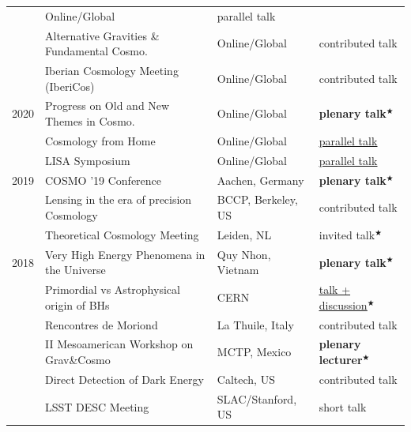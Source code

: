 \documentclass[11pt,a4paper]{article}
\begin{document}
\begin{longtable}{l p{} p{3.5cm} p{3cm}}
& Online/Global 
& parallel talk \\
& Alternative Gravities \& Fundamental Cosmo. %
& Online/Global & contributed talk \\
  & Iberian Cosmology Meeting (IberiCos)
& Online/Global 
& contributed talk \\
2020  & Progress on Old and New Themes in Cosmo. %
& Online/Global %
& \textbf{plenary talk$^\bigstar$} \\
& Cosmology from Home & Online/Global  & \href{https://youtu.be/MHcLT31gaYQ}{\underline{parallel talk}} \\
& LISA Symposium & Online/Global  & \href{https://youtu.be/D3vSuuwIyfs}{\underline{parallel talk}} \\
2019  
& {COSMO '19 Conference} & Aachen, Germany &  \textbf{plenary talk$^\bigstar$}  \\
& {Lensing in the era of precision Cosmology} & BCCP, Berkeley, US &  contributed talk  \\
& {Theoretical Cosmology Meeting} & Leiden, NL & {invited talk$^\bigstar$} \\
2018  
& {Very High Energy Phenomena in the Universe} & Quy Nhon, Vietnam &  \textbf{plenary talk$^\bigstar$}  \\
& {Primordial vs Astrophysical origin of BHs} & CERN &  \href{https://cds.cern.ch/record/2320183}{\underline{talk + discussion}}$^\bigstar$  \\
& {Rencontres de Moriond} & La Thuile, Italy &  {contributed talk}  \\
& II Mesoamerican Workshop on Grav\&Cosmo %
& MCTP, Mexico & \textbf{plenary lecturer$^\bigstar$} \\
      & {Direct Detection of Dark Energy} & Caltech, US & {contributed talk}  \\
      & {LSST DESC Meeting} & SLAC/Stanford, US & {short talk}  \\

\end{longtable}
\end{document}
